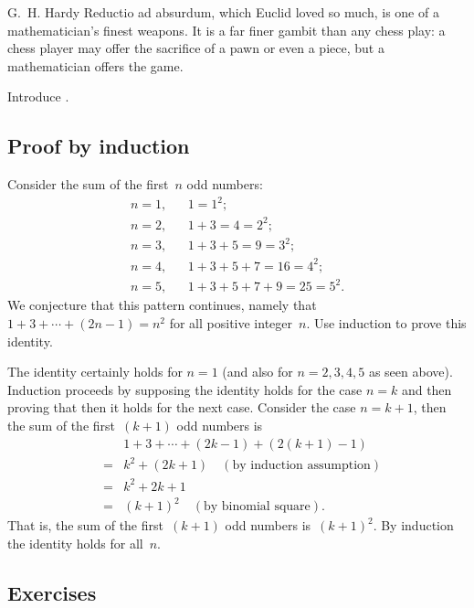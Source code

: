\begin{draft}
\begin{quoted}{G.~H. Hardy}
Reductio ad absurdum, which Euclid loved so much, is one of a mathematician's finest weapons.  
It is a far finer gambit than any chess play: a chess player may offer the sacrifice of a pawn or even a piece, but a mathematician offers the game.
\end{quoted}

Introduce .




\subsection{Proof by induction}
\label{sec:pi}


\begin{example} \label{eg:}
Consider the sum of the first~\(n\) odd numbers:
\begin{eqnarray*}
n=1,&&1=1^2;\\
n=2,&&1+3=4=2^2;\\
n=3,&&1+3+5=9=3^2;\\
n=4,&&1+3+5+7=16=4^2;\\
n=5,&&1+3+5+7+9=25=5^2.
\end{eqnarray*}
We conjecture that this pattern continues, namely that \(1+3+\cdots+(2n-1)=n^2\) for all positive integer~\(n\).
Use induction to prove this identity.
\begin{solution} 
The identity certainly holds for \(n=1\) (and also for \(n=2,3,4,5\) as seen above).
Induction proceeds by supposing the identity holds for the case \(n=k\) and then proving that then it holds for the next case.
Consider the case \(n=k+1\), then the sum of the first~\((k+1)\) odd numbers is
\begin{eqnarray*}
&&1+3+\cdots+(2k-1)+(2(k+1)-1)\\
&=&k^2+(2k+1)\quad(\text{by induction assumption})\\
&=&k^2+2k+1\\
&=&(k+1)^2\quad(\text{by binomial square}).
\end{eqnarray*}
That is, the sum of the first~\((k+1)\) odd numbers is~\((k+1)^2\).
By induction the identity holds for all~\(n\).
\end{solution}
\end{example}





\subsection{Exercises}





\end{draft}
